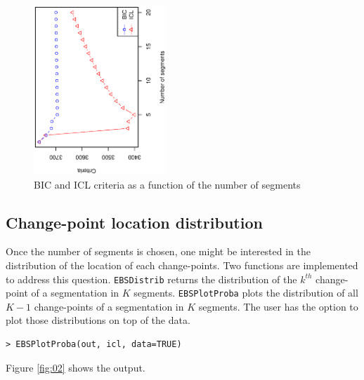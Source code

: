 \documentclass{bioinfo}
\begin{document}
\begin{methods}
\begin{verbatim}
\end{verbatim}


\begin{figure}[!h]%
\centerline{\includegraphics[width=5cm,angle=270]{icl-bic.ps}}
\caption{BIC and ICL criteria as a function of the number of segments} \label{fig:01}
\end{figure}






\subsection{Change-point location distribution}

Once the number of segments is chosen, one might be interested in the distribution of the location of each change-points. Two functions are implemented to address this question. \texttt{EBSDistrib} returns the distribution of the $k^{th}$ change-point of a segmentation in $K$ segments. \texttt{EBSPlotProba} plots the distribution of all $K\!-\!1$ change-points of a segmentation in $K$ segments. The user has the option to plot those distributions on top of the data. 
\begin{verbatim}
> EBSPlotProba(out, icl, data=TRUE)
\end{verbatim}

Figure \ref{fig:02} shows the output. 


\end{methods}
\end{document}
